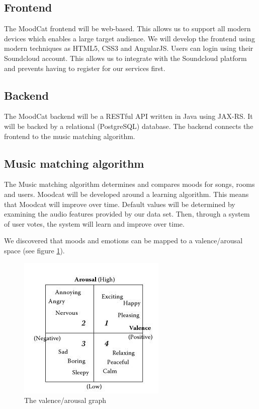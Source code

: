 \newpage

\subsection{Frontend}

The MoodCat frontend will be web-based.
This allows us to support all modern devices which enables a large target audience.
We will develop the frontend using modern techniques as HTML5\cite{HTML}, CSS3\cite{CSS} and AngularJS\cite{AngularJS}.
Users can login using their Soundcloud account.
This allows us to integrate with the Soundcloud platform and prevents having to register for our services first.

\subsection{Backend}

The MoodCat backend will be a RESTful\cite{rest} API written in Java using JAX-RS. It will be backed by a relational (PostgreSQL) database. The backend connects the frontend to the music matching algorithm.

\subsection{Music matching algorithm}

The Music matching algorithm determines and compares moods for songs, rooms and users.
Moodcat will be developed around a learning algorithm.
This means that Moodcat will improve over time.
Default values will be determined by examining the audio features provided by our data set.
Then, through a system of user votes, the system will learn and improve over time.

We discovered that moods and emotions can be mapped to a valence/arousal space\cite{Yang:2006:MEC:1180639.1180665} (see figure \ref{fig:avgraph}).

\begin{figure}[h]
\center
\includegraphics[scale=0.75]{avgraph.jpg}
\caption{The valence/arousal graph \cite{Book}}
\endcenter
\label{fig:avgraph}

\end{figure}

